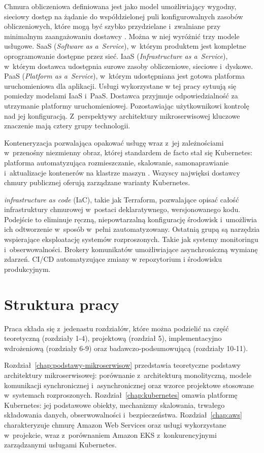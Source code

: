 Chmura obliczeniowa definiowana jest jako model umożliwiający wygodny, sieciowy dostęp na żądanie do współdzielonej puli konfigurowalnych 
zasobów obliczeniowych, które mogą być szybko przydzielane i~zwalniane przy minimalnym zaangażowaniu dostawcy \parencite{nist2011}.
Można w niej wyróżnić trzy modele usługowe. SaaS (\emph{Software as a~Service}), w~którym produktem jest kompletne oprogramowanie dostępne przez sieć.
IaaS (\emph{Infrastructure as a~Service}), w~którym dostawca udostępnia surowe zasoby obliczeniowe, sieciowe i~dyskowe.
PaaS (\emph{Platform as a~Service}), w~którym udostępniana jest gotowa platforma uruchomieniowa dla aplikacji. Usługi wykorzystane w tej pracy
sytuują się pomiedzy modelami IaaS i~PaaS. Dostawca przyjmuje odpowiedzialność za utrzymanie platformy uruchomieniowej. Pozostawiając
użytkownikowi kontrolę nad jej konfiguracją. Z~perspektywy architektury mikroserwisowej kluczowe znaczenie mają cztery grupy technologii.

Konteneryzacja pozwalająca opakować usługę wraz z~jej zależnościami w~przenośny niezmienny obraz, której standardem de facto stał się Kubernetes: 
platforma automatyzująca rozmieszczanie, skalowanie, samonaprawianie i~aktualizacje kontenerów na klastrze maszyn \parencite{burns2022}. 
Wszyscy najwięksi dostawcy chmury publicznej oferują zarządzane warianty Kubernetes.

\emph{infrastructure as code} (IaC), takie jak Terraform, pozwalające opisać całość infrastruktury chmurowej w~postaci deklaratywnego, wersjonowanego kodu.
Podejście to eliminuje ręczną, niepowtarzalną konfigurację środowisk i~umożliwia ich odtworzenie w~sposób w~pełni zautomatyzowany.
Ostatnią grupą są narzędzia wspierające eksploatację systemów rozproszonych. Takie jak systemy monitoringu i~obserwowalności.
Brokery komunikatów umożliwiające asynchroniczną wymianę zdarzeń. CI/CD automatyzujące zmiany w repozytorium i środowisku produkcyjnym.

\section*{Struktura pracy}
{}
\label{sec:struktura-pracy}

Praca składa się z~jedenastu rozdziałów, które można podzielić na część teoretyczną (rozdziały 1-4), projektową (rozdział 5), 
implementacyjno wdrożeniową (rozdziały 6-9) oraz badawczo-podsumowującą (rozdziały 10-11).

Rozdział~\ref{chap:podstawy-mikroserwisow} przedstawia teoretyczne podstawy architektury mikroserwisowej: porównanie z~architekturą monolityczną, 
modele komunikacji synchronicznej i~asynchronicznej oraz wzorce projektowe stosowane w~systemach rozproszonych. 
Rozdział~\ref{chap:kubernetes} omawia platformę Kubernetes: jej podstawowe obiekty, mechanizmy skalowania, trwałego składowania danych, 
obserwowalności i~bezpieczeństwa. Rozdział~\ref{chap:aws} charakteryzuje chmurę Amazon Web Services oraz usługi wykorzystane w~projekcie, 
wraz z~porównaniem Amazon EKS z~konkurencyjnymi zarządzanymi usługami Kubernetes.

